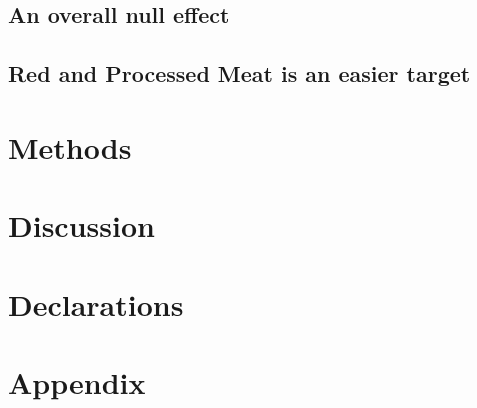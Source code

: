 \documentclass[sn-nature,pdflatex]{sn-jnl}
\begin{document}
\subsection{An overall null effect}\label{an-overall-null-effect}

\subsection{Red and Processed Meat is an easier
target}\label{red-and-processed-meat-is-an-easier-target}

\section{Methods}\label{sec3}

\section{Discussion}\label{sec4}

\backmatter



\section*{Declarations}\label{declarations}

\section{Appendix}\label{secA1}

\renewcommand\refname{Bibliography}

\end{document}
